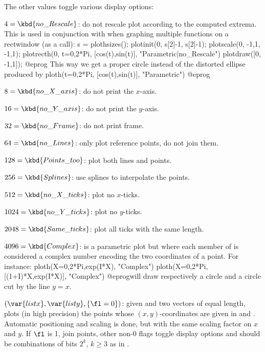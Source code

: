 The other values toggle various display options:

\item $4 = \kbd{no\_Rescale}$: do not rescale plot according to the
computed extrema. This is used in conjunction with  when
graphing multiple functions on a rectwindow (as a  call):
\bprog
  s = plothsizes();
  plotinit(0, s[2]-1, s[2]-1);
  plotscale(0, -1,1, -1,1);
  plotrecth(0, t=0,2*Pi, [cos(t),sin(t)], "Parametric|no_Rescale")
  plotdraw([0, -1,1]);
@eprog\noindent
This way we get a proper circle instead of the distorted ellipse produced by
\bprog
  ploth(t=0,2*Pi, [cos(t),sin(t)], "Parametric")
@eprog

\item $8 = \kbd{no\_X\_axis}$: do not print the $x$-axis.

\item $16 = \kbd{no\_Y\_axis}$: do not print the $y$-axis.

\item $32 = \kbd{no\_Frame}$: do not print frame.

\item $64 = \kbd{no\_Lines}$: only plot reference points, do not join them.

\item $128 = \kbd{Points\_too}$: plot both lines and points.

\item $256 = \kbd{Splines}$: use splines to interpolate the points.

\item $512 = \kbd{no\_X\_ticks}$: plot no $x$-ticks.

\item $1024 = \kbd{no\_Y\_ticks}$: plot no $y$-ticks.

\item $2048 = \kbd{Same\_ticks}$: plot all ticks with the same length.

\item $4096 = \kbd{Complex}$: is a parametric plot but where each member of
 is considered a complex number encoding the two coordinates of a
point. For instance:
\bprog
ploth(X=0,2*Pi,exp(I*X), "Complex")
ploth(X=0,2*Pi,[(1+I)*X,exp(I*X)], "Complex")
@eprog\noindent will draw respectively a circle and a circle cut by the line
$y=x$.

$(\var{listx},\var{listy},\{\fl=0\})$: \label{se:plothraw}given  and  two vectors of equal length, plots (in
high precision) the points whose $(x,y)$-coordinates are given in
 and . Automatic positioning and scaling is done, but
with the same scaling factor on $x$ and $y$. If $\fl$ is 1, join points,
other non-0 flags toggle display options and should be combinations of bits
$2^k$, $k \geq 3$ as in .

